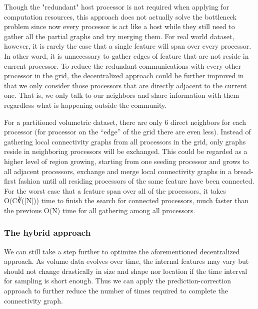 \documentclass[10pt, conference, compsocconf]{IEEEtran}
\begin{document}
Though the "redundant" host processor is not required when applying for computation resources, this approach does not actually solve the bottleneck problem since now every processor is act like a host while they still need to gather all the partial graphs and try merging them. For real world dataset, however, it is rarely the case that a single feature will span over every processor. In other word, it is unnecessary to gather edges of feature that are not reside in current processor. To reduce the redundant communications with every other processor in the grid, the decentralized approach could be further improved in that we only consider those processors that are directly adjacent to the current one. That is, we only talk to our neighbors and share information with them regardless what is happening outside the community. 

For a partitioned volumetric dataset, there are only 6 direct neighbors for each processor (for processor on the “edge” of the grid there are even less). Instead of gathering local connectivity graphs from all processors in the grid, only graphs reside in neighboring processors will be exchanged. This could be regarded as a higher level of region growing, starting from one seeding processor and grows to all adjacent processors, exchange and merge local connectivity graphs in a bread-first fashion until all residing processors of the same feature have been connected. For the worst case that a feature span over all of the processors, it takes O(C∛(|N|)) time to finish the search for connected processors, much faster than the previous O(N) time for all gathering among all processors.

\subsubsection{The hybrid approach}
We can still take a step further to optimize the aforementioned decentralized approach. As volume data evolves over time, the internal features may vary but should not change drastically in size and shape nor location if the time interval for sampling is short enough. Thus we can apply the prediction-correction approach to further reduce the number of times required to complete the connectivity graph. 
\end{document}

